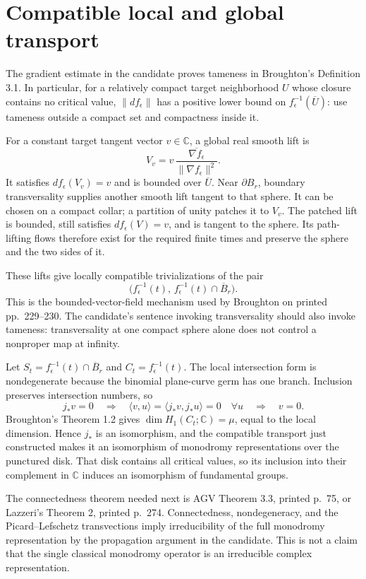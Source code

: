 \documentclass[11pt]{article}
\newcommand{\C}{\mathbb C}
\begin{document}
\section{Compatible local and global transport}
The gradient estimate in the candidate proves tameness in Broughton's Definition 3.1. In particular, for a relatively compact target neighborhood $U$ whose closure contains no critical value, $\|df_\epsilon\|$ has a positive lower bound on $f_\epsilon^{-1}(\overline U)$: use tameness outside a compact set and compactness inside it.

For a constant target tangent vector $v\in\C$, a global real smooth lift is
\[
 V_v=v\,\frac{\overline{\nabla f_\epsilon}}{\|\nabla f_\epsilon\|^2}.
\]
It satisfies $df_\epsilon(V_v)=v$ and is bounded over $\overline U$. Near $\partial B_r$, boundary transversality supplies another smooth lift tangent to that sphere. It can be chosen on a compact collar; a partition of unity patches it to $V_v$. The patched lift is bounded, still satisfies $df_\epsilon(V)=v$, and is tangent to the sphere. Its path-lifting flows therefore exist for the required finite times and preserve the sphere and the two sides of it.

These lifts give locally compatible trivializations of the pair
\[
 \bigl(f_\epsilon^{-1}(t),\,
       f_\epsilon^{-1}(t)\cap\overline B_r\bigr).
\]
This is the bounded-vector-field mechanism used by Broughton on printed pp.~229--230. The candidate's sentence invoking transversality should also invoke tameness: transversality at one compact sphere alone does not control a nonproper map at infinity.

Let $S_t=f_\epsilon^{-1}(t)\cap\overline B_r$ and $C_t=f_\epsilon^{-1}(t)$. The local intersection form is nondegenerate because the binomial plane-curve germ has one branch. Inclusion preserves intersection numbers, so
\[
 j_*v=0\quad\Longrightarrow\quad
 \langle v,u\rangle=\langle j_*v,j_*u\rangle=0\quad\forall u
 \quad\Longrightarrow\quad v=0.
\]
Broughton's Theorem 1.2 gives $\dim H_1(C_t;\C)=\mu$, equal to the local dimension. Hence $j_*$ is an isomorphism, and the compatible transport just constructed makes it an isomorphism of monodromy representations over the punctured disk. That disk contains all critical values, so its inclusion into their complement in $\C$ induces an isomorphism of fundamental groups.

The connectedness theorem needed next is AGV Theorem 3.3, printed p.~75, or Lazzeri's Theorem 2, printed p.~274. Connectedness, nondegeneracy, and the Picard--Lefschetz transvections imply irreducibility of the full monodromy representation by the propagation argument in the candidate. This is not a claim that the single classical monodromy operator is an irreducible complex representation.
\end{document}
